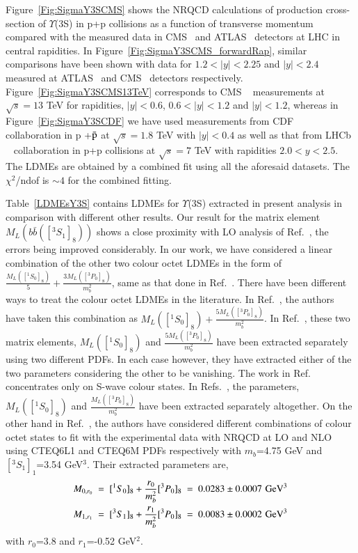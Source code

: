 Figure~\ref{Fig:SigmaY3SCMS} shows the NRQCD calculations of production cross-section of 
$\Upsilon$(3S) in p+p collisions as a function of transverse momentum compared with the 
measured data in CMS~\cite{Khachatryan:2015qpa} and ATLAS~\cite{Aad:2012dlq} 
detectors at LHC in central rapidities. In Figure~\ref{Fig:SigmaY3SCMS_forwardRap},
similar comparisons have been shown with data for $1.2<|y|<2.25$ and $|y|<2.4$
measured at ATLAS~\cite{Aad:2012dlq} and CMS~\cite{Chatrchyan:2013yna} detectors 
respectively. Figure~\ref{Fig:SigmaY3SCMS13TeV} corresponds to CMS ~\cite{Sirunyan:2017qdw}
measurements at $\sqrt{s}=13$ TeV for rapidities, $|y|<0.6$, $0.6<|y|<1.2$ and $|y|<1.2$, whereas in 
Figure~\ref{Fig:SigmaY3SCDF} we have used measurements from CDF~\cite{Acosta:2001gv}
collaboration in p +{$\bar {\rm p}$} at $\sqrt{s}=1.8$ TeV with $|y|<0.4$ as well as
that from LHCb ~\cite{LHCb:2012aa}
collaboration in p+p collisions at $\sqrt{s}=7$ TeV with rapidities $2.0<y<2.5$.
The LDMEs are obtained by a combined fit using all the aforesaid datasets.
The $\chi^2$/ndof is $\sim 4 $ for the combined fitting.

Table~\ref{LDMEsY3S} contains LDMEs for $\Upsilon$(3S) extracted in present analysis
in comparison with different other results. Our result for the matrix element $M_L(b\bar{b}([^3S_1]_8))$
shows a close proximity with LO analysis of Ref.~\cite{Brateen:PRD2001,Sharma:2012dy}, the errors being improved
considerably.
In our work, we have considered a linear combination of the other two colour octet 
LDMEs in the form of $\frac{M_{L}([^1S_0]_{8})}{5}+\frac{3M_{L}([^3P_0]_{8})}{m_b^2}$, same as that
done in Ref.~\cite{Sharma:2012dy}.
There have been different ways to treat the colour octet LDMEs in the literature.
In Ref.~\cite{Domenech:2000ri}, 
the authors have taken this combination as $M_{L}([^1S_0]_{8})+\frac{5M_{L}([^3P_0]_{8})}{m_b^2}$.
In Ref.~\cite{Brateen:PRD2001}, these two matrix elements,
$M_{L}([^1S_0]_{8})$ and $\frac{5M_{L}([^3P_0]_{8})}{m_b^2}$
have been extracted separately using two different PDFs. In each case however, they have extracted
either of the two parameters considering the other to be vanishing.
The work in Ref.~\cite{Gong:2010bk} concentrates only on S-wave colour states.
In Refs.~\cite{Gong:2013qka,Feng:2015wka},
the parameters, $M_{L}([^1S_0]_{8})$ and $\frac{M_{L}([^3P_0]_{8})}{m_b^2}$ have been extracted
separately altogether. On the other hand in Ref.~\cite{Han:2014kxa}, the authors have
considered different combinations of 
colour octet states to fit with the experimental data with NRQCD at LO and NLO using 
CTEQ6L1 and CTEQ6M PDFs respectively with $m_b$=4.75 GeV and $[^3S_1]_1$=3.54 GeV$^3$.
Their extracted parameters are,
\begin{eqnarray}
  \nonumber
  M_{0,r_0}~=~[^1S_0]_8+\frac{r_0}{m_b^2}[^3P_0]_8~=~0.0283\pm 0.0007{\rm \,\, GeV^3} \nonumber \\
  M_{1,r_1}~=~[^3S_1]_8+\frac{r_1}{m_b^2}[^3P_0]_8~=~0.0083\pm 0.0002{\rm \,\,GeV^3} 
\end{eqnarray}
with $r_0$=3.8 and $r_1$=-0.52 GeV$^2$.

